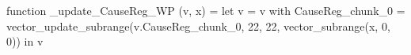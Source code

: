 function _update_CauseReg_WP (v, x) = let v = { v with CauseReg_chunk_0 = vector_update_subrange(v.CauseReg_chunk_0, 22, 22, vector_subrange(x, 0, 0)) } in v
